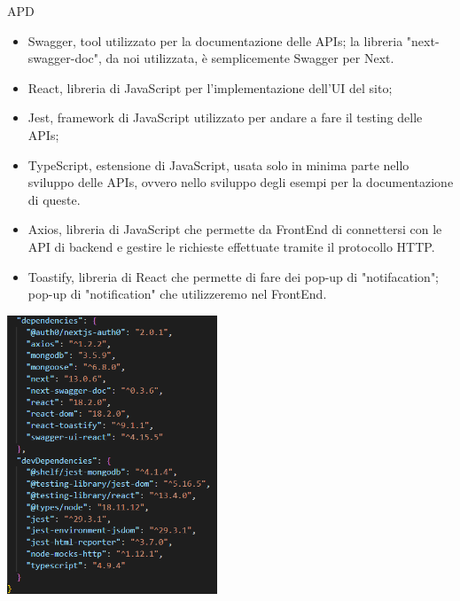 \begin{listaPersonale} {APD}
\begin{itemize}
        \item Swagger, tool utilizzato per la documentazione delle APIs; la libreria "next-swagger-doc", da noi utilizzata, è semplicemente Swagger per Next.
        \item React, libreria di JavaScript per l'implementazione dell'UI del sito;
        \item Jest, framework di JavaScript utilizzato per andare a fare il testing delle APIs;

        \item TypeScript, estensione di JavaScript, usata solo in minima parte nello sviluppo delle APIs, ovvero nello sviluppo degli esempi per la documentazione di queste.
        \item Axios, libreria di JavaScript che permette da FrontEnd di connettersi con le API di backend e gestire le richieste effettuate tramite il protocollo HTTP.
        \item Toastify, libreria di React che permette di fare dei pop-up di "notifacation"; pop-up di "notification" che utilizzeremo nel FrontEnd.
    \end{itemize}
    \begin{center}
        \includegraphics[width=0.47\textwidth, height=0.45\textheight]{img/png/package_json.png}

\end{center}
\end{listaPersonale}
